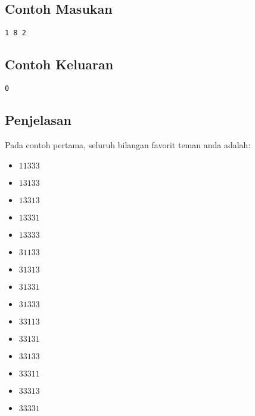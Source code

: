 \documentclass{article}
\begin{document}
\begin{multicols}{2}
\subsection*{Contoh Masukan}
\begin{lstlisting}
1 8 2
\end{lstlisting}
\columnbreak
\subsection*{Contoh Keluaran}
\begin{lstlisting}
0
\end{lstlisting}
\vfill
\null
\end{multicols}

\subsection*{Penjelasan}
Pada contoh pertama, seluruh bilangan favorit teman anda adalah: 

\begin{multicols}{3}
\begin{itemize}
    \item $11333$
    \item $13133$
    \item $13313$
    \item $13331$
    \item $13333$
\end{itemize}
\columnbreak
\begin{itemize}
    \item $31133$
    \item $31313$
    \item $31331$
    \item $31333$
    \item $33113$
\end{itemize}

\columnbreak
\begin{itemize}
    \item $33131$
    \item $33133$
    \item $33311$
    \item $33313$
    \item $33331$
\end{itemize}
\columnbreak
\end{multicols}

\pagebreak
\end{document}
